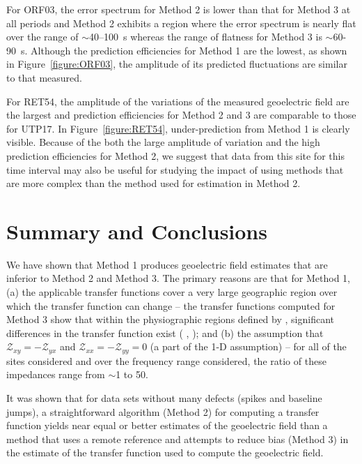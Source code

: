 \documentclass[linenumbers,draft]{agujournal}
\newcommand{\citeay}[1]{%
\citeauthor{#1}, \citeyear{#1}%
}
\begin{document}
For ORF03, the error spectrum for Method 2 is lower than that for Method 3 at all periods and Method 2 exhibits a region where the error spectrum is nearly flat over the range of $\sim$40--100~s whereas the range of flatness for Method 3 is $\sim$60-90~s.  Although the prediction efficiencies for Method 1 are the lowest, as shown in Figure~\ref{figure:ORF03}, the amplitude of its predicted fluctuations are similar to that measured.

For RET54, the amplitude of the variations of the measured geoelectric field are the largest and prediction efficiencies for Method 2 and 3 are comparable to those for UTP17.  In Figure~\ref{figure:RET54}, under-prediction from Method 1 is clearly visible.  Because of the both the large amplitude of variation and the high prediction efficiencies for Method 2, we suggest that data from this site for this time interval may also be useful for studying the impact of using methods that are more complex than the method used for estimation in Method 2.

\section{Summary and Conclusions}

We have shown that Method 1 produces geoelectric field estimates that are inferior to Method 2 and Method 3.  The primary reasons are that for Method 1, (a) the applicable transfer functions cover a very large geographic region over which the transfer function can change -- the transfer functions computed for Method 3 show that within the physiographic regions defined by \cite{Fernberg2012}, significant differences in the transfer function exist (\citeay{Bedrosian2015}); and (b) the assumption that $\mathcal{Z}_{xy}=-\mathcal{Z}_{yx}$ and $\mathcal{Z}_{xx}=-\mathcal{Z}_{yy} = 0$ (a part of the 1-D assumption) -- for all of the sites considered and over the frequency range considered, the ratio of these impedances range from $\sim$1 to 50.

It was shown that for data sets without many defects (spikes and baseline jumps), a straightforward algorithm (Method 2) for computing a transfer function yields near equal or better estimates of the geoelectric field than a method that uses a remote reference and attempts to reduce bias (Method 3) in the estimate of the transfer function used to compute the geoelectric field.
\end{document}
